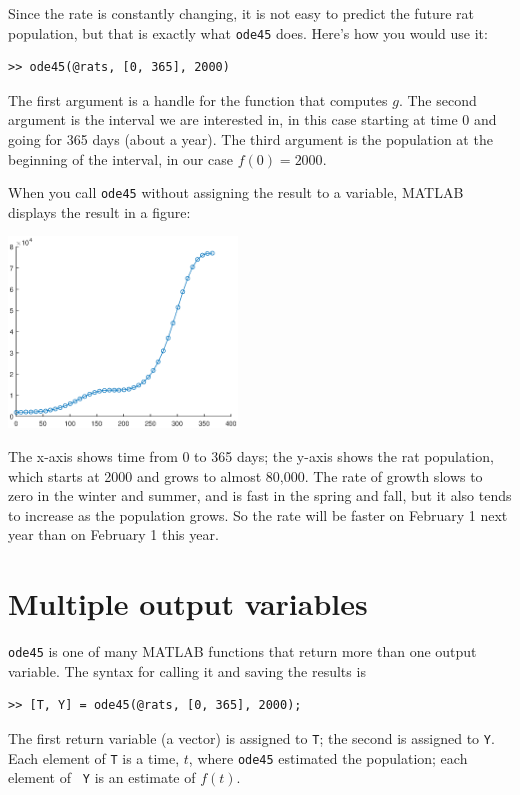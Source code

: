 \documentclass[
]{book}
\begin{document}
Since the rate is constantly changing, it is not easy to predict
the future rat population, but that is exactly what {\tt ode45} does.
Here's how you would use it:

\begin{verbatim}
>> ode45(@rats, [0, 365], 2000)
\end{verbatim}

The first argument is a handle for the function that
computes $g$.  The second argument is the interval we are interested
in, in this case starting at time 0 and going for 365 days (about a year).  
The third argument is the population at the beginning of the interval, 
in our case $f(0) = 2000$.

When you call {\tt ode45} without assigning the result to a variable,
MATLAB displays the result in a figure:

\beforefig \centerline{\includegraphics[height=2in]{figs/rats.eps}}

The x-axis shows time from 0 to 365 days; the y-axis shows the rat
population, which starts at 2000 and grows to almost 80,000.  The rate
of growth slows to zero in the winter and summer, and is fast in the
spring and fall, but it also tends to increase as the population grows.  
So the rate will be faster on February 1 next year than on February 
1 this year.  


\section{Multiple output variables}
\label{sect:rats}

{\tt ode45} is one of many MATLAB functions that return more
than one output variable.  The syntax for calling it and saving
the results is

\begin{verbatim}
>> [T, Y] = ode45(@rats, [0, 365], 2000);
\end{verbatim}

The first return variable (a vector) is assigned to {\tt T}; the second is assigned
to {\tt Y}.  Each element of {\tt T} is a time,
$t$, where {\tt ode45} estimated the population; each element of {\tt
Y} is an estimate of $f(t)$.
\end{document}
